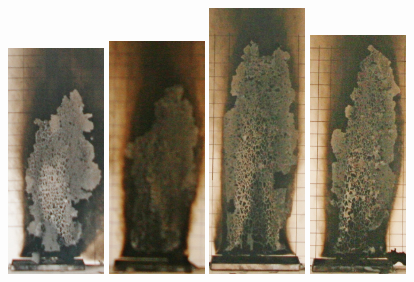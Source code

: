 \documentclass[twoside]{uocthesis}
\begin{document}
\begin{figure}[p]
	\includegraphics[width=1.0in]{../Figures/GBGAS_02_IMG_5554}
	\includegraphics[width=1.0in]{../Figures/GBGAS_05_IMG_5635}
	\includegraphics[width=1.0in]{../Figures/GBGAS_06_IMG_5661}
	\includegraphics[width=1.0in]{../Figures/GBGAS_07_IMG_5679}

\end{figure}
\end{document}

